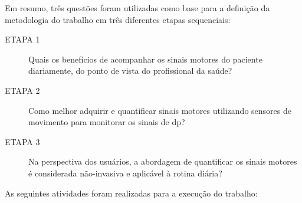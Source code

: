 Em resumo, três questões foram utilizadas como base para a definição da metodologia do trabalho em três diferentes etapas sequenciais:
	\begin{description}
	\item[ETAPA 1] Quais os benefícios de acompanhar os sinais motores do paciente diariamente, do ponto de vista do profissional da saúde?
	\item[ETAPA 2] Como melhor adquirir e quantificar sinais motores utilizando sensores de movimento para monitorar os sinais de \ac{dp}?
	\item[ETAPA 3] Na perspectiva dos usuários, a abordagem de quantificar os sinais motores é considerada não-invasiva e aplicável à rotina diária?
	\end{description}

As seguintes atividades foram realizadas para a execução do trabalho:

